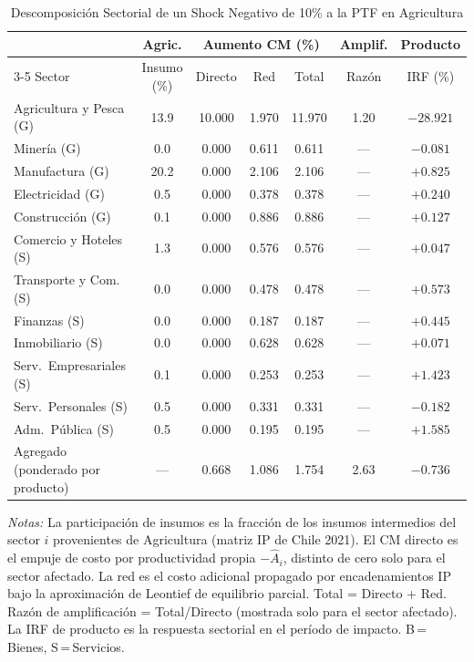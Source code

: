 \begin{table}[htbp]
\centering
\caption{Descomposición Sectorial de un Shock Negativo de 10\% a la PTF en Agricultura}
\label{tab:agr_decomp}
\begin{threeparttable}
\small
\begin{tabular}{@{}l c c c c c c@{}}
\toprule
 & Agric. & \multicolumn{3}{c}{Aumento CM (\%)} & Amplif. & Producto \\
\cmidrule(lr){3-5}
Sector & Insumo (\%) & Directo & Red & Total & Razón & IRF (\%) \\
\midrule
Agricultura y Pesca (G) & 13.9 & 10.000 & 1.970 & 11.970 &  1.20 & $-28.921$ \\
Minería (G) &  0.0 & 0.000 & 0.611 & 0.611 & --- & $-0.081$ \\
Manufactura (G) & 20.2 & 0.000 & 2.106 & 2.106 & --- & $+0.825$ \\
Electricidad (G) &  0.5 & 0.000 & 0.378 & 0.378 & --- & $+0.240$ \\
Construcción (G) &  0.1 & 0.000 & 0.886 & 0.886 & --- & $+0.127$ \\
Comercio y Hoteles (S) &  1.3 & 0.000 & 0.576 & 0.576 & --- & $+0.047$ \\
Transporte y Com. (S) &  0.0 & 0.000 & 0.478 & 0.478 & --- & $+0.573$ \\
Finanzas (S) &  0.0 & 0.000 & 0.187 & 0.187 & --- & $+0.445$ \\
Inmobiliario (S) &  0.0 & 0.000 & 0.628 & 0.628 & --- & $+0.071$ \\
Serv.\ Empresariales (S) &  0.1 & 0.000 & 0.253 & 0.253 & --- & $+1.423$ \\
Serv.\ Personales (S) &  0.5 & 0.000 & 0.331 & 0.331 & --- & $-0.182$ \\
Adm.\ Pública (S) &  0.5 & 0.000 & 0.195 & 0.195 & --- & $+1.585$ \\
\midrule
Agregado (ponderado por producto) & --- & 0.668 & 1.086 & 1.754 &  2.63 & $-0.736$ \\
\bottomrule
\end{tabular}
\begin{tablenotes}[flushleft]
\footnotesize
\item \textit{Notas:} La participación de insumos es la fracción de los insumos intermedios del sector $i$ provenientes de Agricultura (matriz IP de Chile 2021). El CM directo es el empuje de costo por productividad propia $-\hat A_i$, distinto de cero solo para el sector afectado. La red es el costo adicional propagado por encadenamientos IP bajo la aproximación de Leontief de equilibrio parcial. Total = Directo + Red. Razón de amplificación = Total/Directo (mostrada solo para el sector afectado). La IRF de producto es la respuesta sectorial en el período de impacto. B\,=\,Bienes, S\,=\,Servicios.
\end{tablenotes}
\end{threeparttable}
\end{table}
